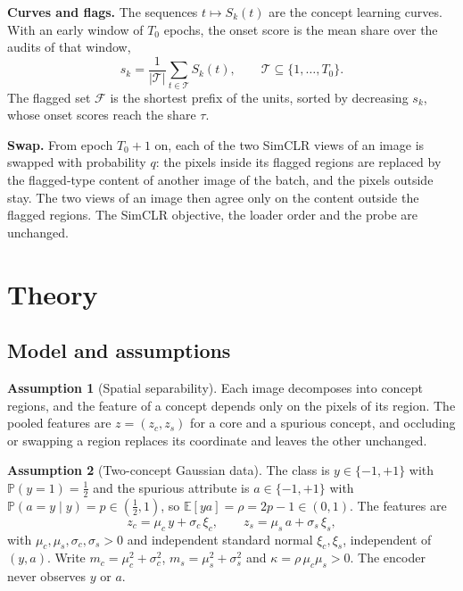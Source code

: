\documentclass[11pt]{article}
\theoremstyle{definition}
\newtheorem{assumption}{Assumption}
\theoremstyle{remark}
\newcommand{\E}{\mathbb{E}}
\newcommand{\Prob}{\mathbb{P}}
\begin{document}
\textbf{Curves and flags.} The sequences $t\mapsto S_k(t)$ are the concept learning curves. With an early window of
$T_0$ epochs, the onset score is the mean share over the audits of that window,
\begin{equation}\label{eq:onset}
s_k=\frac{1}{|\mathcal{T}|}\sum_{t\in\mathcal{T}}S_k(t),\qquad \mathcal{T}\subseteq\{1,\dots,T_0\}.
\end{equation}
The flagged set $\mathcal{F}$ is the shortest prefix of the units, sorted by decreasing $s_k$, whose onset scores reach
the share $\tau$.

\textbf{Swap.} From epoch $T_0+1$ on, each of the two SimCLR views of an image is swapped with probability $q$: the
pixels inside its flagged regions are replaced by the flagged-type content of another image of the batch, and the
pixels outside stay. The two views of an image then agree only on the content outside the flagged regions. The
SimCLR objective, the loader order and the probe are unchanged.

\section{Theory}\label{sec:theory}

\subsection{Model and assumptions}\label{sec:model}

\begin{assumption}[Spatial separability]\label{as:sep}
Each image decomposes into concept regions, and the feature of a concept depends only on the pixels of its region.
The pooled features are $z=(z_c,z_s)$ for a core and a spurious concept, and occluding or swapping a region replaces
its coordinate and leaves the other unchanged.
\end{assumption}

\begin{assumption}[Two-concept Gaussian data]\label{as:data}
The class is $y\in\{-1,+1\}$ with $\Prob(y=1)=\tfrac12$ and the spurious attribute is $a\in\{-1,+1\}$ with
$\Prob(a=y\mid y)=p\in(\tfrac12,1)$, so $\E[ya]=\rho=2p-1\in(0,1)$. The features are
\[
z_c=\mu_c\,y+\sigma_c\,\xi_c,\qquad z_s=\mu_s\,a+\sigma_s\,\xi_s ,
\]
with $\mu_c,\mu_s,\sigma_c,\sigma_s>0$ and independent standard normal $\xi_c,\xi_s$, independent of $(y,a)$. Write
$m_c=\mu_c^2+\sigma_c^2$, $m_s=\mu_s^2+\sigma_s^2$ and $\kappa=\rho\,\mu_c\mu_s>0$. The encoder never observes $y$ or $a$.
\end{assumption}
\end{document}
